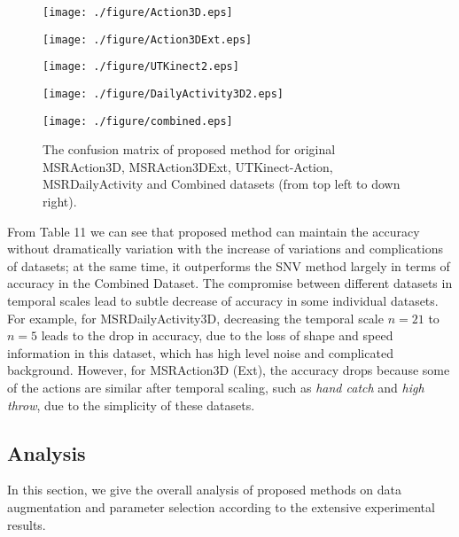 \documentclass[conference]{IEEEtran}
\begin{document}
\begin{figure}
\begin{minipage}[t]{0.5\linewidth}
\centering
\texttt{[image: ./figure/Action3D.eps]}
\label{fig:side:a}
\end{minipage}%
\begin{minipage}[t]{0.5\linewidth}
\centering
\texttt{[image: ./figure/Action3DExt.eps]}
\label{fig:side:b}
\end{minipage}
\begin{minipage}[t]{0.5\linewidth}
\centering
\texttt{[image: ./figure/UTKinect2.eps]}
\label{fig:side:a}
\end{minipage}%
\begin{minipage}[t]{0.5\linewidth}
\centering
\texttt{[image: ./figure/DailyActivity3D2.eps]}
\label{fig:side:b}
\end{minipage}
\begin{minipage}[t]{1\linewidth}
\centering
\texttt{[image: ./figure/combined.eps]}
\label{fig:side:b}
\end{minipage}
\caption{The confusion matrix of proposed method for original MSRAction3D, MSRAction3DExt, UTKinect-Action, MSRDailyActivity and Combined datasets (from top left to down right).}
\end{figure}

From Table 11 we can see that proposed method can maintain the accuracy without dramatically variation with the increase of variations and complications of datasets; at the same time, it outperforms the SNV method largely in terms of accuracy in the Combined Dataset. The compromise between different datasets in temporal scales lead to subtle decrease of accuracy in some individual datasets. For example, for MSRDailyActivity3D, decreasing the temporal scale $n = 21$ to $n = 5$ leads to the drop in accuracy, due to the loss of shape and speed information in this dataset, which has high level noise and complicated background. However, for MSRAction3D (Ext), the accuracy drops because some of the actions are similar after temporal scaling, such as \textit{hand catch} and \textit{high throw}, due to the simplicity of these datasets.

\subsection{Analysis}
In this section, we give the overall analysis of proposed methods on data augmentation and parameter selection according to the extensive experimental results.
\end{document}
